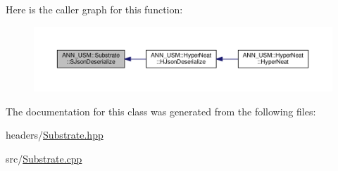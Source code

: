 Here is the caller graph for this function\-:
\nopagebreak
\begin{figure}[H]
\begin{center}
\leavevmode
\includegraphics[width=350pt]{class_a_n_n___u_s_m_1_1_substrate_a5e3ad4577e03d0c4dbb2eef576d0e6a9_icgraph}
\end{center}
\end{figure}




The documentation for this class was generated from the following files\-:\begin{DoxyCompactItemize}
\item 
headers/\hyperlink{_substrate_8hpp}{Substrate.\-hpp}\item 
src/\hyperlink{_substrate_8cpp}{Substrate.\-cpp}\end{DoxyCompactItemize}
